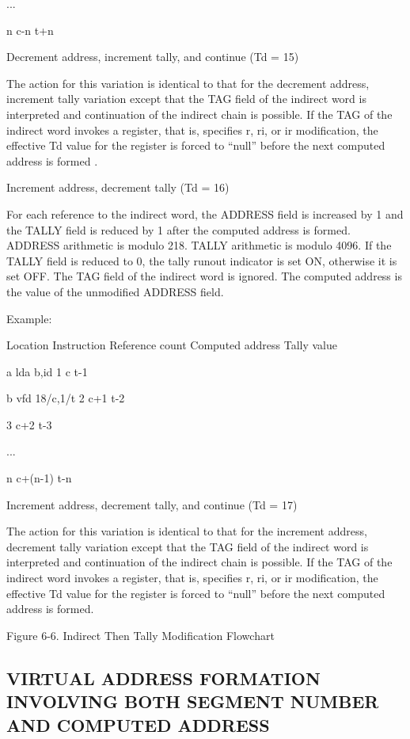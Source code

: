 ...

n c-n t+n

Decrement address, increment tally, and continue (Td = 15)

The action for this variation is identical to that for the decrement address, increment tally variation except that the TAG field of the indirect word is interpreted and continuation of the indirect chain is possible. If the TAG of the indirect word invokes a register, that is, specifies r, ri, or ir modification, the effective Td value for the register is forced to {``}null'' 
before the next computed address is formed .

Increment address, decrement tally (Td = 16)

For each reference to the indirect word, the ADDRESS field is increased by 1
and the TALLY field is reduced by 1 after the computed address is formed.
ADDRESS arithmetic is modulo 218. TALLY arithmetic is modulo 4096. If the TALLY
field is reduced to 0, the tally runout indicator is set ON, otherwise it is
set OFF. The TAG field of the indirect word is ignored. The computed address is
the value of the unmodified ADDRESS field.


Example:

Location Instruction Reference count Computed address Tally value

a lda b,id 1 c t-1

b vfd 18/c,1/t 2 c+1 t-2

3 c+2 t-3

...

n c+(n-1) t-n

Increment address, decrement tally, and continue (Td = 17)


The action for this variation is identical to that for the increment address,
decrement tally variation except that the TAG field of the indirect word is
interpreted and continuation of the indirect chain is possible. If the TAG of
the indirect word invokes a register, that is, specifies r, ri, or ir
modification, the effective Td value for the register is forced to {``}null''
before the next computed address is formed.


Figure 6-6. Indirect Then Tally Modification Flowchart


\subsection{VIRTUAL ADDRESS FORMATION INVOLVING BOTH SEGMENT NUMBER AND COMPUTED ADDRESS}

